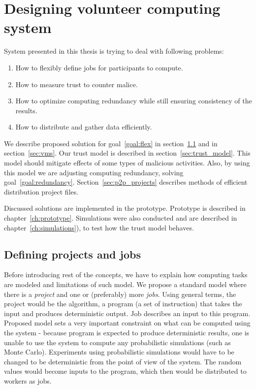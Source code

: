\chapter{Designing volunteer computing system}

System presented in this thesis is trying to deal with following problems:
\begin{enumerate}
\item \label{goal:flex} How to flexibly define jobs for participants to compute.
\item \label{goal:malice} How to measure trust to counter malice.
\item \label{goal:redundancy} How to optimize computing redundancy while still ensuring consistency of the results.
\item \label{goal:efficient} How to distribute and gather data efficiently.
\end{enumerate}

We describe proposed solution for goal~\ref{goal:flex} in section~\ref{sec:defining_projects} and in section~\ref{sec:vms}. Our trust model is described in section~\ref{sec:trust_model}. This model should mitigate effects of some types of malicious activities. Also, by using this model we are adjusting computing redundancy, solving goal~\ref{goal:redundancy}. Section~\ref{sec:p2p_projects} describes methods of efficient distribution project files.

Discussed solutions are implemented in the prototype. Prototype is described in chapter~\ref{ch:prototype}. Simulations were also conducted and are described in chapter~\ref{ch:simulations}), to test how the trust model behaves.

\section{Defining projects and jobs}
\label{sec:defining_projects}

Before introducing rest of the concepts, we have to explain how computing tasks are modeled and limitations of such model. We propose a standard model where there is a \emph{project} and one or (preferably) more \emph{jobs}. Using general terms, the project would be the algorithm, a program (a set of instruction) that takes the input and produces deterministic output. Job describes an input to this program. Proposed model sets a very important constraint on what can be computed using the system - because program is expected to produce deterministic results, one is unable to use the system to compute any probabilistic simulations (such as Monte Carlo). Experiments using probabilistic simulations would have to be changed to be deterministic from the point of view of the system. The random values would become inputs to the program, which then would be distributed to workers as jobs.

